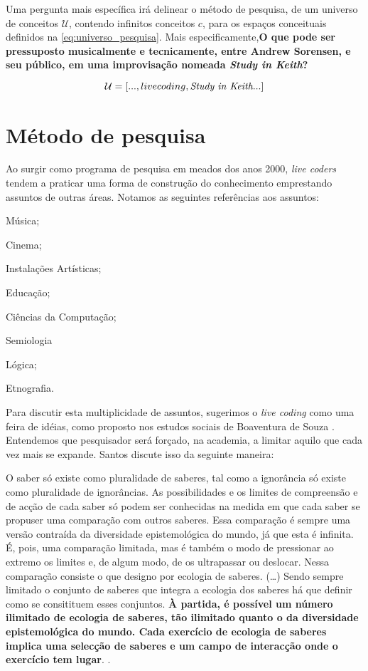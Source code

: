 Uma pergunta mais específica irá delinear o método de pesquisa, de um universo de conceitos $\mathcal{U}$, contendo infinitos conceitos $c$, para os espaços conceituais definidos na \autoref{eq:universo_pesquisa}. Mais especificamente,\textbf{O que pode ser pressuposto musicalmente e tecnicamente, entre Andrew Sorensen, e seu público, em uma improvisação nomeada \emph{Study in Keith}?}

\begin{equation}
\mathcal{U} = [..., livecoding, \emph{Study in Keith}...]
\end{equation}\label{eq:universo_pesquisa}

\section{Método de pesquisa}\label{conjunto_conhecimentos}

Ao surgir como programa de pesquisa em meados dos anos 2000, \emph{live coders} tendem a praticar uma forma de construção do conhecimento emprestando assuntos de outras áreas. Notamos as seguintes referências aos assuntos: \begin{inparaenum}[(1)]
\item Música;
\item Cinema;
\item Instalações Artísticas;
\item Educação;
\item Ciências da Computação;
\item Semiologia
\item Lógica;
\item Etnografia.
\end{inparaenum}\label{par:metodo1}

Para discutir esta multiplicidade de assuntos, sugerimos o \emph{live coding} como uma feira de idéias, como proposto nos estudos sociais de Boaventura de Souza . Entendemos que pesquisador será forçado, na academia, a limitar aquilo que cada vez mais se expande. Santos discute isso da seguinte maneira:

\begin{citacao}
O saber só existe como pluralidade de saberes, tal como a ignorância só existe como pluralidade de ignorâncias. As possibilidades e os limites de compreensão e de acção de cada saber só podem ser conhecidas na medida em que cada saber se propuser uma comparação com outros saberes. Essa comparação é sempre uma versão contraída da diversidade epistemológica do mundo, já que esta é infinita. É, pois, uma comparação limitada, mas é também o modo de pressionar ao extremo os limites e, de algum modo, de os ultrapassar ou deslocar. Nessa comparação consiste o que designo por ecologia de saberes. (\ldots) Sendo sempre limitado o conjunto de saberes que integra a ecologia dos saberes há que definir como se consitituem esses conjuntos. \textbf{À partida, é possível um número ilimitado de ecologia de saberes, tão ilimitado quanto o da diversidade epistemológica do mundo. Cada exercício de ecologia de saberes implica uma selecção de saberes e um campo de interacção onde o exercício tem lugar}. \cite[p.~28-30]{santos_filosofia_2008}.
\end{citacao}


